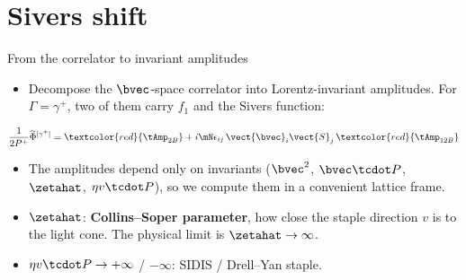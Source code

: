 \section{Sivers shift}

\begin{frame}{From the correlator to invariant amplitudes}
  \begin{itemize}
    \item Decompose the $\bvec$-space correlator into Lorentz-invariant amplitudes. For $\Gamma=\gamma^+$, two of them carry $f_1$ and the Sivers function:
  \end{itemize}
  \[ \frac{1}{2 P^+}\widetilde \Phi^{[\gamma^+]} = \textcolor{red}{\tAmp_{2B}} + i \mN \epsilon_{ij}\, \vect{\bvec}_i \vect{S}_j\, \textcolor{red}{\tAmp_{12B}} \]
  \begin{itemize}
    \item The amplitudes depend only on invariants ($\bvec^2$, $\bvec\tcdot P$, $\zetahat$, $\eta v\tcdot P$), so we compute them in a convenient lattice frame.
    \item $\zetahat$: \textbf{Collins--Soper parameter}, how close the staple direction $v$ is to the light cone. The physical limit is $\zetahat\to\infty$.
    \item $\eta v\tcdot P\to+\infty$ / $-\infty$: SIDIS / Drell--Yan staple.
  \end{itemize}
\end{frame}

